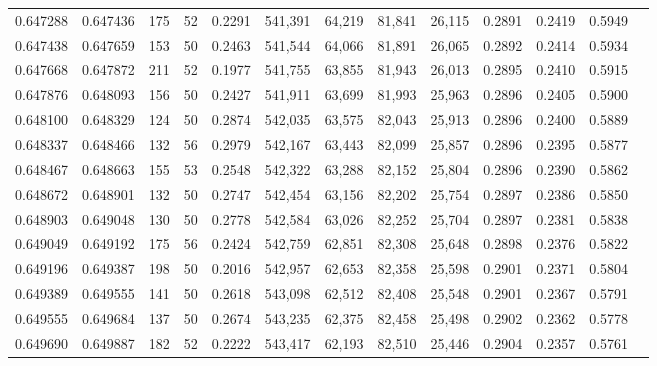 \begin{tabular}{rrrrrrrrrrrrr}
0.647288 & 0.647436 &   175 &  52 &                                     0.2291 & 541,391 &  64,219 &  81,841 &  26,115 & 0.2891 & 0.2419 & 0.5949 \\
0.647438 & 0.647659 &   153 &  50 &                                     0.2463 & 541,544 &  64,066 &  81,891 &  26,065 & 0.2892 & 0.2414 & 0.5934 \\
0.647668 & 0.647872 &   211 &  52 &                                     0.1977 & 541,755 &  63,855 &  81,943 &  26,013 & 0.2895 & 0.2410 & 0.5915 \\
0.647876 & 0.648093 &   156 &  50 &                                     0.2427 & 541,911 &  63,699 &  81,993 &  25,963 & 0.2896 & 0.2405 & 0.5900 \\
0.648100 & 0.648329 &   124 &  50 &                                     0.2874 & 542,035 &  63,575 &  82,043 &  25,913 & 0.2896 & 0.2400 & 0.5889 \\
0.648337 & 0.648466 &   132 &  56 &                                     0.2979 & 542,167 &  63,443 &  82,099 &  25,857 & 0.2896 & 0.2395 & 0.5877 \\
0.648467 & 0.648663 &   155 &  53 &                                     0.2548 & 542,322 &  63,288 &  82,152 &  25,804 & 0.2896 & 0.2390 & 0.5862 \\
0.648672 & 0.648901 &   132 &  50 &                                     0.2747 & 542,454 &  63,156 &  82,202 &  25,754 & 0.2897 & 0.2386 & 0.5850 \\
0.648903 & 0.649048 &   130 &  50 &                                     0.2778 & 542,584 &  63,026 &  82,252 &  25,704 & 0.2897 & 0.2381 & 0.5838 \\
0.649049 & 0.649192 &   175 &  56 &                                     0.2424 & 542,759 &  62,851 &  82,308 &  25,648 & 0.2898 & 0.2376 & 0.5822 \\
0.649196 & 0.649387 &   198 &  50 &                                     0.2016 & 542,957 &  62,653 &  82,358 &  25,598 & 0.2901 & 0.2371 & 0.5804 \\
0.649389 & 0.649555 &   141 &  50 &                                     0.2618 & 543,098 &  62,512 &  82,408 &  25,548 & 0.2901 & 0.2367 & 0.5791 \\
0.649555 & 0.649684 &   137 &  50 &                                     0.2674 & 543,235 &  62,375 &  82,458 &  25,498 & 0.2902 & 0.2362 & 0.5778 \\
0.649690 & 0.649887 &   182 &  52 &                                     0.2222 & 543,417 &  62,193 &  82,510 &  25,446 & 0.2904 & 0.2357 & 0.5761 \\

\end{tabular}

